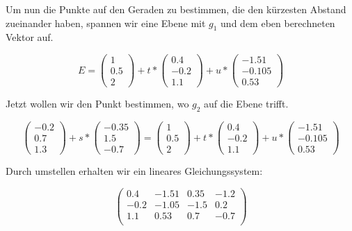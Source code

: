\documentclass{article}
\begin{document}
Um nun die Punkte auf den Geraden zu bestimmen, die den kürzesten Abstand zueinander haben, spannen wir eine Ebene mit \(g_1\) und dem eben berechneten Vektor auf.

\[
    E = 
    \begin{pmatrix}
        1 \\ 0.5 \\ 2
    \end{pmatrix}
    + t * 
    \begin{pmatrix}
        0.4 \\ -0.2 \\ 1.1
    \end{pmatrix}
    + u * 
    \begin{pmatrix}
        -1.51 \\ -0.105 \\ 0.53
    \end{pmatrix}
\]

Jetzt wollen wir den Punkt bestimmen, wo \(g_2\) auf die Ebene trifft.

\[
    \begin{pmatrix}
        -0.2 \\ 0.7 \\ 1.3
    \end{pmatrix}
    + s *
    \begin{pmatrix}
        -0.35 \\ 1.5 \\ -0.7
    \end{pmatrix}
    =
    \begin{pmatrix}
        1 \\ 0.5 \\ 2
    \end{pmatrix}
    + t * 
    \begin{pmatrix}
        0.4 \\ -0.2 \\ 1.1
    \end{pmatrix}
    + u * 
    \begin{pmatrix}
        -1.51 \\ -0.105 \\ 0.53
    \end{pmatrix}
\]

Durch umstellen erhalten wir ein lineares Gleichungssystem:

\[
    \left(
    \begin{array}{ccc|c}
        0.4 & -1.51 & 0.35 & -1.2 \\
        -0.2 & -1.05 & -1.5 & 0.2 \\
        1.1 & 0.53 & 0.7 & -0.7 \\
    \end{array}
    \right)
\]
\end{document}
